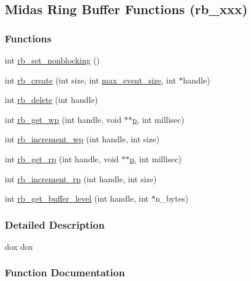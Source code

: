 \subsection{Midas Ring Buffer Functions (rb\_\-xxx)}
\label{group__rbfunctionc}
\subsubsection*{Functions}
\begin{DoxyCompactItemize}
\item 
int \hyperlink{group__rbfunctionc_gaabc49ab7300eae65b5cbdbaa00921a5d}{rb\_\-set\_\-nonblocking} ()
\item 
int \hyperlink{group__rbfunctionc_gae447c0770b51e5e0e173905f8700ce0f}{rb\_\-create} (int size, int \hyperlink{frontend_8c_a13adb6e6b95ca2a62bbfe2453d71a1cd}{max\_\-event\_\-size}, int $\ast$handle)
\item 
int \hyperlink{group__rbfunctionc_ga215007fcea0c4786c38091fd793f4c4e}{rb\_\-delete} (int handle)
\item 
int \hyperlink{group__rbfunctionc_ga26333526532b367bfacce172d6adcfa6}{rb\_\-get\_\-wp} (int handle, void $\ast$$\ast$\hyperlink{sis3803_8c_afcb0609a0beab248bb3994a3368bd9ff}{p}, int millisec)
\item 
int \hyperlink{group__rbfunctionc_gad79588efc047402f5264e3ae9dc3bacc}{rb\_\-increment\_\-wp} (int handle, int size)
\item 
int \hyperlink{group__rbfunctionc_ga0335381f2ef26fd5251bc7b30d6d1e90}{rb\_\-get\_\-rp} (int handle, void $\ast$$\ast$\hyperlink{sis3803_8c_afcb0609a0beab248bb3994a3368bd9ff}{p}, int millisec)
\item 
int \hyperlink{group__rbfunctionc_ga4d2d9f33813530718f4b1f3d423a3b7b}{rb\_\-increment\_\-rp} (int handle, int size)
\item 
int \hyperlink{group__rbfunctionc_gae92c348180d666240c295b7c334b4ebe}{rb\_\-get\_\-buffer\_\-level} (int handle, int $\ast$n\_\-bytes)
\end{DoxyCompactItemize}


\subsubsection{Detailed Description}
dox dox 

\subsubsection{Function Documentation}
